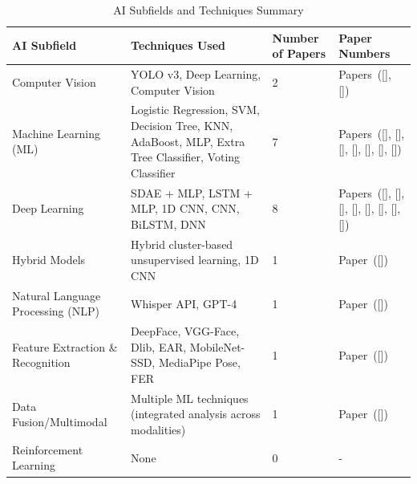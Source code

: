 \documentclass[12pt]{article}
\begin{document}
\begin{table}[H]
\centering
\caption{AI Subfields and Techniques Summary}
\begin{tabular}{|p{4.5cm}|p{6cm}|p{2cm}|p{4cm}|}
\hline
\textbf{AI Subfield} & \textbf{Techniques Used} & \textbf{Number of Papers} & \textbf{Paper Numbers} \\
\hline
Computer Vision & YOLO v3, Deep Learning, Computer Vision & 2 &  Papers~([\citealp{ref1}], [\citealp{ref8}]) \\
\hline
Machine Learning (ML) & Logistic Regression, SVM, Decision Tree, KNN, AdaBoost, MLP, Extra Tree Classifier, Voting Classifier & 7 &  Papers~([\citealp{ref2}], [\citealp{ref3}], [\citealp{ref7}], [\citealp{ref9}], [\citealp{ref10}], [\citealp{ref12}], [\citealp{ref13}]) \\
\hline
Deep Learning & SDAE + MLP, LSTM + MLP, 1D CNN, CNN, BiLSTM, DNN & 8 & Papers~([\citealp{ref3}], [\citealp{ref4}], [\citealp{ref6}], [\citealp{ref8}], [\citealp{ref11}], [\citealp{ref12}], [\citealp{ref18}], [\citealp{ref19}]) \\
\hline
Hybrid Models & Hybrid cluster-based unsupervised learning, 1D CNN & 1 & Paper~([\citealp{ref4}]) \\
\hline
Natural Language Processing (NLP) & Whisper API, GPT-4 & 1 & Paper~([\citealp{ref6}]) \\
\hline
Feature Extraction \& Recognition & DeepFace, VGG-Face, Dlib, EAR, MobileNet-SSD, MediaPipe Pose, FER & 1 & Paper~([\citealp{ref6}]) \\
\hline
Data Fusion/Multimodal & Multiple ML techniques (integrated analysis across modalities) & 1 & Paper~([\citealp{ref7}]) \\
\hline
Reinforcement Learning & None & 0 & - \\
\hline
\end{tabular}
\end{table}
\end{document}
